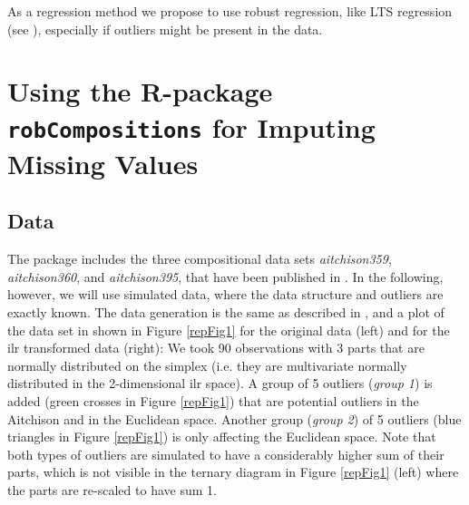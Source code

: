 \documentclass{scrartcl}
\begin{document}
As a regression method we propose to use robust regression, like LTS regression
(see \cite{Maronna06}), especially if outliers might be present in the data.


\section{Using the R-package \texttt{robCompositions} for Imputing Missing Values}

%

%
%
%
%

\subsection{Data}

The package includes the three compositional data sets \textit{aitchison359},
\textit{aitchison360}, and \textit{aitchison395}, that have been published
in \cite{Aitchison86}. In the following, however, we will use simulated data,
where the data structure and outliers are exactly known.
The data generation is the same as described in \cite{Hron09}, and
a plot of the data set in shown in Figure \ref{repFig1} for the original
data (left) and for the ilr transformed data (right): We took 90 
observations with 3 parts that are normally distributed on the simplex
(i.e. they are multivariate normally distributed in the 2-dimensional
ilr space). A group of 5 outliers (\textit{group 1}) 
is added (green crosses in Figure \ref{repFig1})
that are potential outliers in the Aitchison and in the Euclidean space.
Another group (\textit{group 2}) of 5 outliers (blue triangles in Figure \ref{repFig1})
is only affecting the Euclidean space. Note that both types of outliers are
simulated to have a considerably higher sum of their parts, which is not visible
in the ternary diagram \citep{Aitchison86} in Figure \ref{repFig1} (left) where the parts
are re-scaled to have sum 1.
\end{document}
